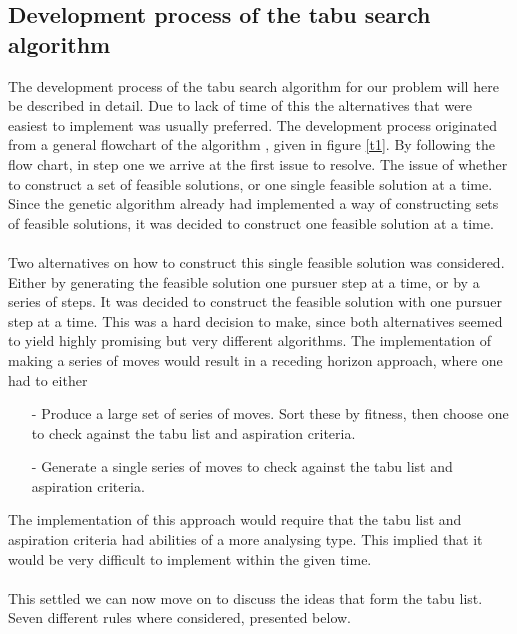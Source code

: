 \subsection{Development process of the tabu search algorithm}
The development process of the tabu search algorithm for our problem will here be described in detail. Due to lack of time of this the alternatives that were easiest to implement was usually preferred. The development process originated from a general flowchart of the algorithm \cite{canada} \cite{Glover2}, given in figure \ref{t1}. By following the flow chart, in step one we arrive at the first issue to resolve. The issue of whether to construct a set of feasible solutions, or one single feasible solution at a time. Since the genetic algorithm already had implemented a way of constructing sets of feasible solutions, it was decided to construct one feasible solution at a time.\\
\\
Two alternatives on how to construct this single feasible solution was considered. Either by generating the feasible solution one pursuer step at a time, or by a series of steps. It was decided to construct the feasible solution with one pursuer step at a time. This was a hard decision to make, since both alternatives seemed to yield highly promising but very different algorithms. The implementation of making a series of moves would result in a receding horizon approach, where one had to either  
\begin{itemize}
\item[-]{}Produce a large set of series of moves. Sort these by fitness, then choose one to check against the tabu list and aspiration criteria.
\item[-]{}Generate a single series of moves to check against the tabu list and aspiration criteria.
\end{itemize}
The implementation of this approach would require that the tabu list and aspiration criteria had abilities of a more analysing type. This implied that it would be very difficult to implement within the given time.\\
\\This settled we can now move on to discuss the ideas that form the tabu list. Seven different rules where considered, presented below.
